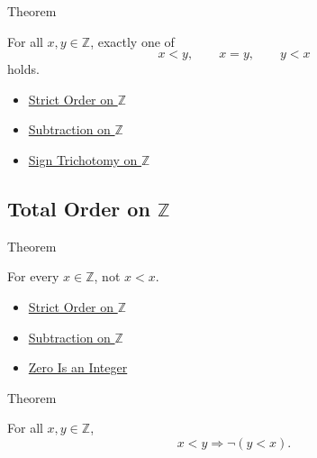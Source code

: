 \begin{theorembox}{Theorem}
\begin{theorem}
\label{thm:trichotomy-on-z}
For all $x,y\in\mathbb{Z}$, exactly one of
\[
x<y,\qquad x=y,\qquad y<x
\]
holds.
\end{theorem}
\end{theorembox}

\begin{dependencies}
\begin{itemize}
  \item \hyperref[def:strict-order-on-z]{Strict Order on $\mathbb{Z}$}
  \item \hyperref[def:subtraction-on-z]{Subtraction on $\mathbb{Z}$}
  \item \hyperref[thm:sign-trichotomy-on-z]{Sign Trichotomy on $\mathbb{Z}$}
\end{itemize}
\end{dependencies}

\subsection*{\texorpdfstring{Total Order on $\mathbb{Z}$}{Total Order on Z}}

\begin{theorembox}{Theorem}
\begin{theorem}
\label{thm:strict-order-on-z-irreflexive}
For every $x\in\mathbb{Z}$, not $x<x$.
\end{theorem}
\end{theorembox}

\begin{dependencies}
\begin{itemize}
  \item \hyperref[def:strict-order-on-z]{Strict Order on $\mathbb{Z}$}
  \item \hyperref[def:subtraction-on-z]{Subtraction on $\mathbb{Z}$}
  \item \hyperref[thm:zero-is-an-integer]{Zero Is an Integer}
\end{itemize}
\end{dependencies}

\begin{theorembox}{Theorem}
\begin{theorem}
\label{thm:strict-order-on-z-asymmetric}
For all $x,y\in\mathbb{Z}$,
\[
x<y \Longrightarrow \neg(y<x).
\]
\end{theorem}
\end{theorembox}

